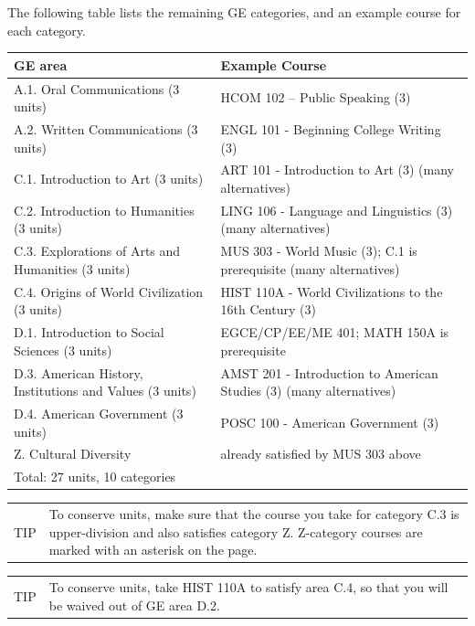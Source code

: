 \documentclass{book}
\newenvironment{tip}{
  \tcolorbox \begin{tabular}{m{.5in} m{5in}} \Large{TIP} &
}{
  \end{tabular} \endtcolorbox
}
\begin{document}
The following table lists the remaining GE categories, and an example course for each category.

\begin{center}
\begin{tabular}{| p{3in} | p{3in} |} \hline
  \textbf{GE area} & \textbf{Example Course} \\ \hline
  A.1. Oral Communications (3 units) & HCOM 102 – Public Speaking (3) \\ \hline
  A.2. Written Communications (3 units) & ENGL 101 - Beginning College Writing (3) \\ \hline
  C.1. Introduction to Art (3 units) & ART 101 - Introduction to Art (3) (many alternatives) \\ \hline
  C.2. Introduction to Humanities (3 units) & LING 106 - Language and Linguistics (3) (many alternatives) \\ \hline
  C.3. Explorations of Arts and Humanities (3 units) & MUS 303 - World Music (3); C.1 is prerequisite (many alternatives) \\ \hline
  C.4. Origins of World Civilization (3 units) & HIST 110A - World Civilizations to the 16th Century (3) \\ \hline
  D.1. Introduction to Social Sciences (3 units) & EGCE/CP/EE/ME 401; MATH 150A is prerequisite \\ \hline
  D.3. American History, Institutions and Values (3 units) & AMST 201 - Introduction to American Studies (3) (many alternatives) \\ \hline
  D.4. American Government (3 units) & POSC 100 - American Government (3) \\ \hline
  Z. Cultural Diversity & already satisfied by MUS 303 above \\ \hline
  \multicolumn{2}{|l|}{Total: 27 units, 10 categories} \\ \hline
\end{tabular}
\end{center}

\begin{tip}
To conserve units, make sure that the course you take for category C.3 is upper-division and also satisfies category Z. Z-category courses are marked with an asterisk on the \gecourselist page.
\end{tip}

\begin{tip}
  To conserve units, take HIST 110A to satisfy area C.4, so that you will be waived out of GE area D.2.
  \end{tip}
\end{document}

